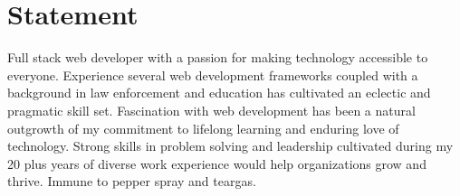 \section{Statement}
Full stack web developer with a passion for making technology accessible to everyone.  Experience several web development frameworks coupled with a background in law enforcement and education has cultivated an eclectic and pragmatic skill set. Fascination with web development has been a natural outgrowth of my commitment to lifelong learning and enduring love of technology. Strong skills in problem solving and leadership cultivated during my 20 plus years of diverse work experience would help organizations grow and thrive. Immune to pepper spray and teargas. 